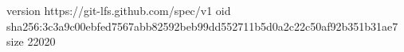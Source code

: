version https://git-lfs.github.com/spec/v1
oid sha256:3c3a9c00ebfed7567abb82592beb99dd552711b5d0a2c22c50af92b351b31ae7
size 22020
